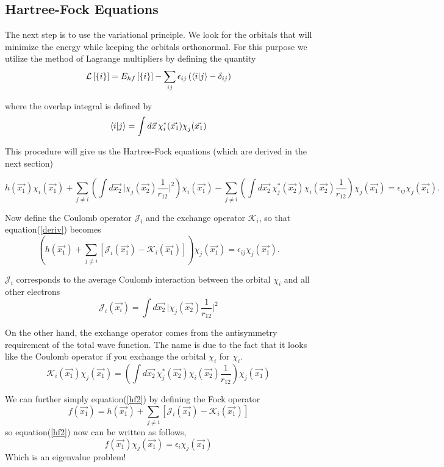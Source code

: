 \documentclass[a4paper]{article}
\begin{document}
\subsection{Hartree-Fock Equations}
The next step is to use the variational principle. 
We look for the orbitals that will minimize the energy while keeping the orbitals orthonormal.
For this purpose we utilize the method of Lagrange multipliers by defining the quantity
$$
\mathcal{L} \left[ \{ i \}\right] =  E_{hf} \left[\{i\}\right] - \sum_{ij} \epsilon_{ij} \left(\braket{i | j} - \delta_{ij} \right)
$$

where the overlap integral is defined by
$$
\braket{i | j} = \int d\vec{x} \, \chi^{*}_{i} (\vec{x_1}) \chi^{}_{j} (\vec{x_1})
$$

This procedure will give us the Hartree-Fock equations (which are derived in the next section)

\begin{dmath} \label{deriv}
h(\vec{x_1}) \chi^{}_{i} (\vec{x_1}) + 
\sum_{j\neq i} \left( \int d\vec{x_2} \, \big| \chi_{j} (\vec{x_2}) \frac{1}{r_{12}}\big|^2 \right) \chi_{i} (\vec{x_1}) -
\sum_{j\neq i} \left( \int d\vec{x_2} \, \chi^{*}_{j} (\vec{x_2}) \chi_i (\vec{x_2})  \frac{1}{r_{12}} \right) \chi_{j} (\vec{x_1})
= \epsilon_{ij} \chi_{j} (\vec{x_1}).
\end{dmath}

Now define the Coulomb operator $\mathcal{J}_i$ and the exchange operator $\mathcal{K}_i$, so that equation(\ref{deriv}) becomes
\begin{equation} \label{hf2}
\left( h(\vec{x_1}) + \sum_{j\neq i}\left[ \mathcal{J}_i(\vec{x_1}) - \mathcal{K}_i(\vec{x_1}) \right] \right)\chi_{j}(\vec{x_1})
= \epsilon_{ij} \chi_{j} (\vec{x_1}).
\end{equation}

$\mathcal{J}_i$ corresponds to the average Coulomb interaction between the orbital $\chi_i$ and all other electrons
$$
\mathcal{J}_i (\vec{x_i}) =
\int d\vec{x_2} \, \big| \chi_{j} (\vec{x_2}) \frac{1}{r_{12}}\big|^2 
$$

On the other hand, the exchange operator comes from the antisymmetry requirement of the total wave function. The name is due to the fact that it looks like the Coulomb operator if you exchange the orbital $\chi_i$ for $\chi_i$.
$$
\mathcal{K}_i(\vec{x_1}) \chi_{j} (\vec{x_1}) =
\left( \int d\vec{x_2} \, \chi^{*}_{j} (\vec{x_2}) \chi_i (\vec{x_2})  \frac{1}{r_{12}} \right) \chi_{j} (\vec{x_1})
$$

We can further simply equation(\ref{hf2}) by defining the Fock operator
$$
f(\vec{x_1}) = h(\vec{x_1}) + \sum_{j\neq i}\left[ \mathcal{J}_i(\vec{x_1}) - \mathcal{K}_i(\vec{x_1}) \right]
$$
so equation(\ref{hf2}) now can be written as follows,
$$
f(\vec{x_1}) \chi_{j}(\vec{x_1}) = \epsilon_i \chi_{j} (\vec{x_1})
$$
Which is an eigenvalue problem!
\end{document}
